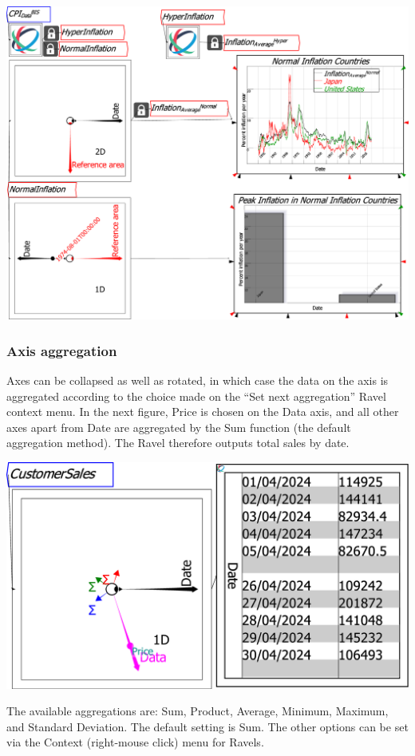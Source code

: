 \includegraphics[width=15cm]{images/CPI_SubsetsAxisRotation}

\subsubsection{Axis aggregation}

Axes can be collapsed as well as rotated, in which case the data on
the axis is aggregated according to the choice made on the ``Set
next aggregation'' Ravel context menu. In the next figure, Price
is chosen on the Data axis, and all other axes apart from Date are
aggregated by the Sum function (the default aggregation method). The
Ravel therefore outputs total sales by date.

\noindent\includegraphics[width=\textwidth]{images/SmallBusinessAggregation}

The available aggregations are: Sum, Product, Average, Minimum, Maximum,
and Standard Deviation. The default setting is Sum. The other options
can be set via the Context (right-mouse click) menu for Ravels.

